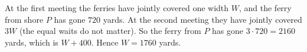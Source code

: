 At the first meeting the ferries have jointly covered one width $W$, and the ferry from shore $P$ has gone $720$ yards. At the second meeting they have jointly covered $3W$ (the equal waits do not matter). So the ferry from $P$ has gone $3\cdot720=2160$ yards, which is $W+400$. Hence $W=\boxed{1760}$ yards.
